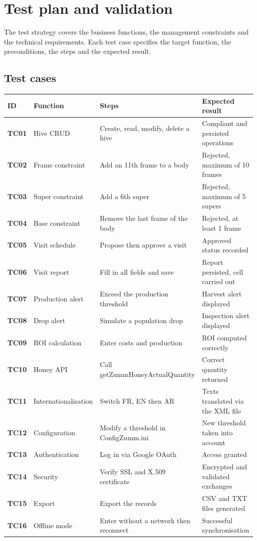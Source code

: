 \chapter{Test plan and validation}
\label{chap:tests}
The test strategy covers the business functions, the management constraints and
the technical requirements. Each test case specifies the target function, the
preconditions, the steps and the expected result.

\section{Test cases}
\begin{xltabular}{\textwidth}{>{\bfseries}p{1.4cm} p{3.6cm} p{4.2cm} X}
\toprule
\textbf{ID} & \textbf{Function} & \textbf{Steps} & \textbf{Expected result} \\
\midrule
\endhead
TC01 & Hive CRUD & Create, read, modify, delete a hive & Compliant and persisted operations \\
TC02 & Frame constraint & Add an 11th frame to a body & Rejected, maximum of 10 frames \\
TC03 & Super constraint & Add a 6th super & Rejected, maximum of 5 supers \\
TC04 & Base constraint & Remove the last frame of the body & Rejected, at least 1 frame \\
TC05 & Visit schedule & Propose then approve a visit & Approved status recorded \\
TC06 & Visit report & Fill in all fields and save & Report persisted, cell carried out \\
TC07 & Production alert & Exceed the production threshold & Harvest alert displayed \\
TC08 & Drop alert & Simulate a population drop & Inspection alert displayed \\
TC09 & ROI calculation & Enter costs and production & ROI computed correctly \\
TC10 & Honey API & Call getZummHoneyActualQuantity & Correct quantity returned \\
TC11 & Internationalisation & Switch FR, EN then AR & Texts translated via the XML file \\
TC12 & Configuration & Modify a threshold in ConfigZumm.ini & New threshold taken into account \\
TC13 & Authentication & Log in via Google OAuth & Access granted \\
TC14 & Security & Verify SSL and X.509 certificate & Encrypted and validated exchanges \\
TC15 & Export & Export the records & CSV and TXT files generated \\
TC16 & Offline mode & Enter without a network then reconnect & Successful synchronisation \\
\bottomrule
\end{xltabular}

